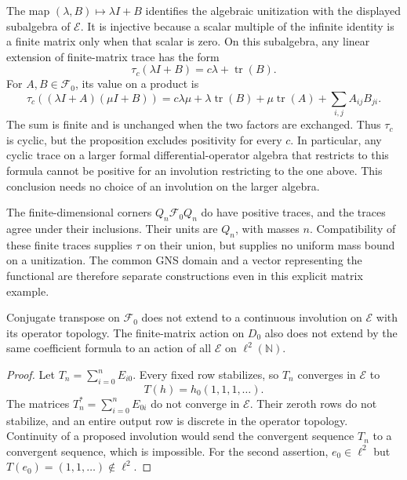 The map $(\lambda,B)\mapsto\lambda I+B$ identifies the algebraic
unitization with the displayed subalgebra of $\mathscr E$.
It is injective because a scalar multiple of the infinite identity is
a finite matrix only when that scalar is zero.
On this subalgebra, any linear extension of finite-matrix trace has the
form
\[
 \tau_c(\lambda I+B)=c\lambda+\operatorname{tr}(B).
\]
For $A,B\in\mathscr F_0$, its value on a product is
\[
 \tau_c((\lambda I+A)(\mu I+B))
 =c\lambda\mu+\lambda\operatorname{tr}(B)
       +\mu\operatorname{tr}(A)+\sum_{i,j}A_{ij}B_{ji}.
\]
The sum is finite and is unchanged when the two factors are exchanged.
Thus $\tau_c$ is cyclic, but the proposition excludes positivity for every $c$.  In particular, any cyclic trace on
a larger formal differential-operator algebra that restricts to this
formula cannot be positive for an involution restricting to the one above.
This conclusion needs no choice of an involution on the larger algebra.

The finite-dimensional corners $Q_n\mathscr F_0Q_n$ do have positive
traces, and the traces agree under their inclusions.  Their units are
$Q_n$, with masses $n$.  Compatibility of these finite traces supplies
$\tau$ on their union, but supplies no uniform mass bound on a unitization.
The common GNS domain and a vector representing the functional are
therefore separate constructions even in this explicit matrix example.

\begin{proposition}
\label{prop:weil-formal-adjoint}
Conjugate transpose on $\mathscr F_0$ does not extend to a continuous
involution on $\mathscr E$ with its operator topology.
The finite-matrix action on $D_0$ also does not extend by the same
coefficient formula to an action of all $\mathscr E$ on
$\ell^2(\mathbb N)$.
\end{proposition}
\begin{proof}
Let $T_n=\sum_{i=0}^nE_{i0}$.
Every fixed row stabilizes, so $T_n$ converges in $\mathscr E$ to
\[
 T(h)=h_0(1,1,1,\ldots).
\]
The matrices $T_n^*=\sum_{i=0}^nE_{0i}$ do not converge in
$\mathscr E$.  Their zeroth rows do not stabilize, and an entire output
row is discrete in the operator topology.  Continuity of a proposed
involution would send the convergent sequence $T_n$ to a convergent
sequence, which is impossible.
For the second assertion, $e_0\in\ell^2$ but
$T(e_0)=(1,1,\ldots)\notin\ell^2$.
\end{proof}

